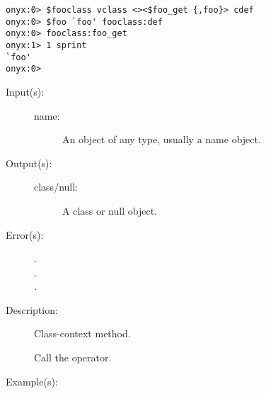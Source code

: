 \begin{description}
\begin{description}
\begin{verbatim}
onyx:0> $fooclass vclass <><$foo_get {,foo}> cdef
onyx:0> $foo `foo' fooclass:def
onyx:0> fooclass:foo_get
onyx:1> 1 sprint
`foo'
onyx:0>
		\end{verbatim}
	\end{description}
\label{vclass:implementor}
\item[{\onyxop{name}{implementor}{class/null}}: ]
	\begin{description}\item[]
	\item[Input(s): ]
		\begin{description}\item[]
		\item[name: ]
			An object of any type, usually a name object.
		\end{description}
	\item[Output(s): ]
		\begin{description}\item[]
		\item[class/null: ]
			A class or null object.
		\end{description}
	\item[Error(s): ]
		\begin{description}\item[]
		\item[.]
		\item[.]
		\item[.]
		\end{description}
	\item[Description: ]
		Class-context method.

		Call the
		operator.
	\item[Example(s): ]\begin{verbatim}


\end{verbatim}
\end{description}
\end{description}
